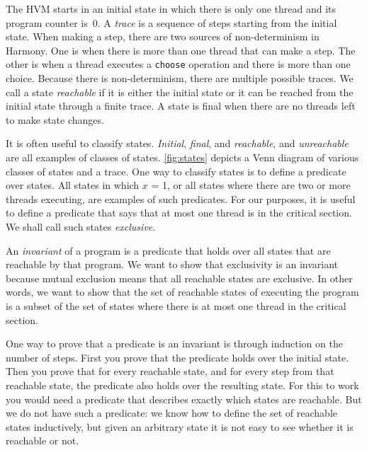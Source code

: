 \documentclass{report}
\begin{document}
%
%

The HVM starts in an initial state in which there is only
one thread and its program counter is~0.  A \emph{trace}
%
is a sequence of steps starting from the initial state.
When making a step, there are two sources of non-determinism
%
in Harmony.
One is when
there is more than one thread that can make a step.  The other is
when a thread executes a \texttt{choose} operation and there is
more than one choice.
Because there is non-determinism, there are multiple possible traces.
We call a state \emph{reachable}
%
if it is either the initial state
or it can be reached from the initial state through a finite trace.
A state is final
when there are no threads left to make state changes.

It is often useful to classify states.
\emph{Initial}, \emph{final}, and \emph{reachable}, and \emph{unreachable}
are all examples of classes of states.
\autoref{fig:states} depicts a Venn diagram of various classes of states
and a trace.
One way to classify states is to define a predicate over states.
All states in which $x$ = 1, or all states where
there are two or more threads executing, are examples of such predicates.
For our purposes, it is useful to define a predicate that says that at
most one thread is in the critical section.  We shall call such states
\emph{exclusive}.

An \emph{invariant} of a program
%
is a predicate that holds over all states that are reachable by that program.
We want to show that exclusivity is an invariant because mutual exclusion means
that all reachable states are exclusive.
In other words, we want to show that the set of reachable states of executing
the program
is a subset of the set of states where there is at most one thread in the critical
section.

One way to prove that a predicate is an invariant is through induction
on the number of steps.  First you prove that the predicate holds over
the initial state.  Then you prove that for every reachable state,
and for every step from that reachable state, the predicate also holds
over the resulting state.
For this to work you would need a predicate that describes exactly which
states are reachable.
But we do not have such a predicate: we know how to define the set
of reachable states inductively, but given an arbitrary state it is not
easy to see whether it is reachable or not.
\end{document}
